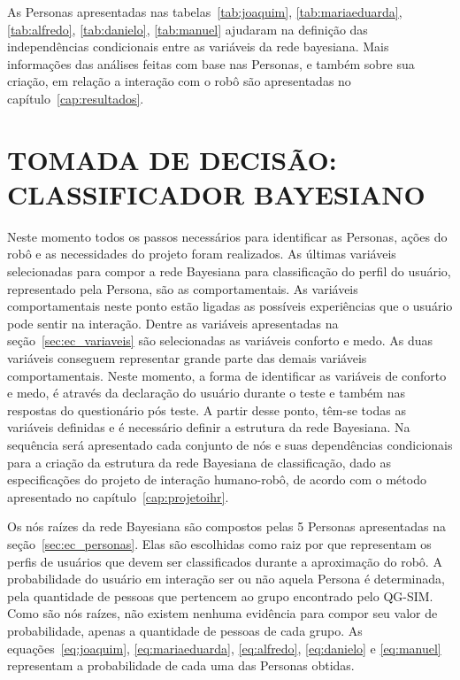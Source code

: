 As Personas apresentadas nas tabelas~\ref{tab:joaquim}, \ref{tab:mariaeduarda}, \ref{tab:alfredo}, \ref{tab:danielo}, \ref{tab:manuel} ajudaram na definição das independências condicionais entre as variáveis da rede bayesiana. Mais informações das análises feitas com base nas Personas, e também sobre sua criação, em relação a interação com o robô são apresentadas no capítulo~\ref{cap:resultados}.

\section{TOMADA DE DECISÃO: CLASSIFICADOR BAYESIANO}
\label{sec:rede-bayesiana}
Neste momento todos os passos necessários para identificar as Personas, ações do robô e as necessidades do projeto foram realizados. As últimas variáveis selecionadas para compor a rede Bayesiana para classificação do perfil do usuário, representado pela Persona, são as comportamentais. As variáveis comportamentais neste ponto estão ligadas as possíveis experiências que o usuário pode sentir na interação. Dentre as variáveis apresentadas na seção~\ref{sec:ec_variaveis} são selecionadas as variáveis conforto e medo. As duas variáveis conseguem representar grande parte das demais variáveis comportamentais. Neste momento, a forma de identificar as variáveis de conforto e medo, é através da declaração do usuário durante o teste e também nas respostas do questionário pós teste. A partir desse ponto, têm-se todas as variáveis definidas e é necessário definir a estrutura da rede Bayesiana. Na sequência será apresentado cada conjunto de nós e suas dependências condicionais para a criação da estrutura da rede Bayesiana de classificação, dado as especificações do projeto de interação humano-robô, de acordo com o método apresentado no capítulo~\ref{cap:projetoihr}.

Os nós raízes da rede Bayesiana são compostos pelas 5 Personas apresentadas na seção~\ref{sec:ec_personas}. Elas são escolhidas como raiz por que representam os perfis de usuários que devem ser classificados durante a aproximação do robô. A probabilidade do usuário em interação ser ou não aquela Persona é determinada, pela quantidade de pessoas que pertencem ao grupo encontrado pelo QG-SIM. Como são nós raízes, não existem nenhuma evidência para compor seu valor de probabilidade, apenas a quantidade de pessoas de cada grupo. As equações~\ref{eq:joaquim}, \ref{eq:mariaeduarda}, \ref{eq:alfredo}, \ref{eq:danielo} e \ref{eq:manuel} representam a probabilidade de cada uma das Personas obtidas.

